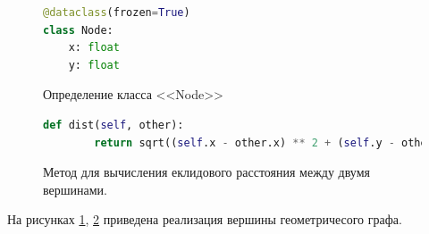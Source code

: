 \begin{figure}[H] 
\begin{lstlisting}[language=Python] 
@dataclass(frozen=True)
class Node:
    x: float
    y: float
\end{lstlisting}  
    \caption{Определение класса <<Node>>}
    \label{pynode_1}
\end{figure} 
\begin{figure}[H] 
\begin{lstlisting}[language=Python] 
    def dist(self, other):
        return sqrt((self.x - other.x) ** 2 + (self.y - other.y)**2)
\end{lstlisting}  
    \caption{Метод для вычисления еклидового расстояния между двумя вершинами.}
    \label{pynode_2}
\end{figure} 
На рисунках \ref{pynode_1}, \ref{pynode_2} приведена реализация вершины 
геометричесого графа.

